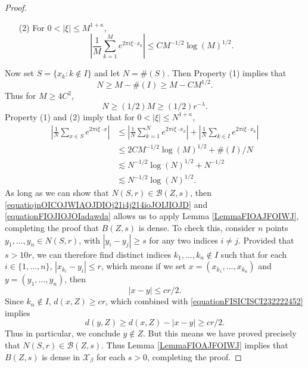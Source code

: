 \documentclass[dvipsnames,letterpaper,12pt]{article}
\numberwithin{equation}{section}
\numberwithin{theorem}{section}
\begin{document}
\begin{proof}
\begin{itemize}
        \item[(2)] For $0 < |\xi| \leq M^{1 + \kappa}$,
        \[ \left| \frac{1}{M} \sum_{k = 1}^M e^{2 \pi i \xi \cdot x_k} \right| \leq C M^{-1/2} \log(M)^{1/2}. \]
    \end{itemize}
    Now set $S = \{ x_k : k \not \in I \}$ and let $N = \#(S)$. Then Property (1) implies that
    \begin{equation}
        N \geq M - \#(I) \geq M - C M^{1/2}.
    \end{equation}
    Thus for $M \geq 4C^2$,
    \begin{equation} \label{equatiojnOICOJWIAOJDIOj21i4j214ioJOIJIOJD}
        N \geq (1/2) M \geq (1/2) r^{-\lambda}.
    \end{equation}
    Property (1) and (2) imply that for $0 < |\xi| \leq N^{1 + \kappa}$,
    \begin{equation} \label{equationFIOJIOJOIadawda}
    \begin{split}
        \left| \frac{1}{N} \sum_{x \in S} e^{2 \pi i \xi \cdot x} \right| &\leq \left| \frac{1}{N} \sum_{k = 1}^N e^{2 \pi i \xi \cdot x_k} \right| + \left| \frac{1}{N} \sum_{k \in I} e^{2 \pi i \xi \cdot x_k} \right|\\
        &\leq 2C M^{-1/2} \log(M)^{1/2} + \#(I)/N \\
        &\lesssim N^{-1/2} \log(N)^{1/2} + N^{-1/2}\\
        &\lesssim N^{-1/2} \log(N)^{1/2}.
    \end{split}
    \end{equation}
    As long as we can show that $N(S,r) \in \mathcal{B}(Z,s)$, then \eqref{equatiojnOICOJWIAOJDIOj21i4j214ioJOIJIOJD} and \eqref{equationFIOJIOJOIadawda} allows us to apply Lemma \ref{LemmaFIOAJFOIWJ}, completing the proof that $B(Z,s)$ is dense. To check this, consider $n$ points $y_1,\dots,y_n \in N(S,r)$, with $|y_i - y_j| \geq s$ for any two indices $i \neq j$. Provided that $s > 10r$, we can therefore find distinct indices $k_1, \dots, k_n \not \in I$ such that for each $i \in \{ 1, \dots, n \}$, $|x_{k_i} - y_i| \leq r$, which means if we set $x = (x_{k_1}, \dots, x_{k_n})$ and $y = (y_1, \dots, y_n)$, then
    \begin{equation} \label{equationFISICISCI232222452}
        |x - y| \leq cr/2.
    \end{equation}
    Since $k_n \not \in I$, $d(x,Z) \geq cr$, which combined with \eqref{equationFISICISCI232222452} implies
    \begin{equation} \label{equationSICSICI}
        d(y,Z) \geq d(x,Z) - |x - y| \geq cr/2.
    \end{equation}
    Thus in particular, we conclude $y \not \in Z$. But this means we have proved precisely that $N(S,r) \in \mathcal{B}(Z,s)$. Thus Lemma \ref{LemmaFIOAJFOIWJ} implies that $B(Z,s)$ is dense in $\mathcal{X}_\beta$ for each $s > 0$, completing the proof.
\end{proof}
\end{document}
